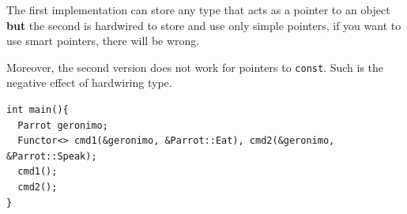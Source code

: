 The first implementation can store any type that acts as a pointer to an
object \textbf{but} the second is hardwired to store and use only
simple pointers, if you want to use smart pointers, there will be
wrong.

Moreover, the second version does not work for pointers to
\texttt{const}. Such is the negative effect of hardwiring type.

\begin{verbatim}
int main(){
  Parrot geronimo;
  Functor<> cmd1(&geronimo, &Parrot::Eat), cmd2(&geronimo, &Parrot::Speak);
  cmd1();
  cmd2();
}
\end{verbatim}
